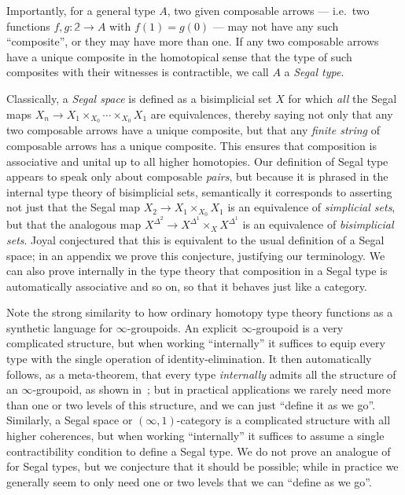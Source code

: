 \documentclass[12pt]{amsart}
\theoremstyle{plain}
\theoremstyle{definition}
\theoremstyle{remark}
\numberwithin{equation}{section}
\newcommand{\two}{\mathbb{2}}
\begin{document}
Importantly, for a general type $A$, two given composable arrows --- i.e.\ two functions $f,g:\two\to A$ with $f(1)=g(0)$ --- may not have any such ``composite'', or they may have more than one.
If any two composable arrows have a unique composite in the homotopical sense that the type of such composites with their witnesses is contractible, we call $A$ a \emph{Segal type}.

Classically, a \emph{Segal space} is defined as a bisimplicial set $X$ for which \emph{all} the Segal maps $X_n \to X_1\times_{X_0}\cdots \times_{X_0} X_1$ are equivalences, thereby saying not only that any two composable arrows have a unique composite, but that any \emph{finite string} of composable arrows has a unique composite.
This ensures that composition is associative and unital up to all higher homotopies.
Our definition of Segal type appears to speak only about composable \emph{pairs}, but because it is phrased in the internal type theory of bisimplicial sets, semantically it corresponds to asserting not just that the Segal map $X_2 \to X_1\times_{X_0} X_1$ is an equivalence of \emph{simplicial sets}, but that the analogous map $X^{\Delta^2} \to X^{\Delta^1} \times_X X^{\Delta^1}$ is an equivalence of \emph{bisimplicial sets}.
Joyal conjectured that this is equivalent to the usual definition of a Segal space; in an appendix we prove this conjecture, justifying our terminology.
We can also prove internally in the type theory that composition in a Segal type is automatically associative and so on, so that it behaves just like a category.

Note the strong similarity to how ordinary homotopy type theory functions as a synthetic language for $\infty$-groupoids.
An explicit $\infty$-groupoid is a very complicated structure, but when working ``internally'' it suffices to equip every type with the single operation of identity-elimination.
It then automatically follows, as a meta-theorem, that every type \emph{internally} admits all the structure of an $\infty$-groupoid, as shown in~\cite{vdbg:oogpds,pll:oogpds}; but in practical applications we rarely need more than one or two levels of this structure, and we can just ``define it as we go''.
Similarly, a Segal space or $(\infty,1)$-category is a complicated structure with all higher coherences, but when working ``internally'' it suffices to assume a single contractibility condition to define a Segal type.
We do not prove an analogue of~\cite{vdbg:oogpds,pll:oogpds} for Segal types, but we conjecture that it should be possible; while in practice we generally seem to only need one or two levels that we can ``define as we go''.
\end{document}
